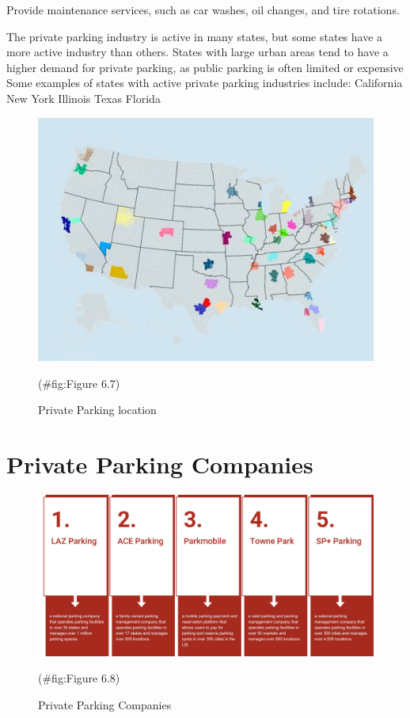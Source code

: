 \documentclass[
]{book}
\begin{document}
Provide maintenance services, such as car washes, oil changes, and tire rotations.

The private parking industry is active in many states, but some states have a more active industry than others.
States with large urban areas tend to have a higher demand for private parking, as public parking is often limited or expensive
Some examples of states with active private parking industries include:
California
New York
Illinois
Texas
Florida

\begin{figure}

{\centering \includegraphics{./Images/Parking/Private Parking location} 

}

\caption{Private Parking location}(\#fig:Figure 6.7)
\end{figure}

\hypertarget{parking-companies}{%
\section{Private Parking Companies}\label{parking-companies}}

\begin{figure}

{\centering \includegraphics{./Images/Parking/Private Parking Companies} 

}

\caption{Private Parking Companies}(\#fig:Figure 6.8)
\end{figure}
\end{document}
